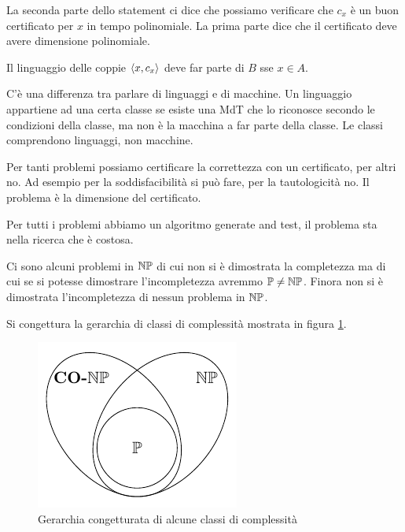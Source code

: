La seconda parte dello statement ci dice che possiamo verificare che $c_{x}$ è un buon certificato per
$x$ in tempo polinomiale. La prima parte dice che il certificato deve avere dimensione polinomiale.

Il linguaggio delle coppie $\langle x, c_{x} \rangle$ deve far parte di $B$ sse $x \in A$. 

C'è una differenza tra parlare di linguaggi e di macchine. Un linguaggio appartiene ad una certa
classe se esiste una MdT che lo riconosce secondo le condizioni della classe, ma non è la macchina
a far parte della classe. Le classi comprendono linguaggi, non macchine.

Per tanti problemi possiamo certificare la correttezza con un certificato, per altri no. Ad esempio
per la soddisfacibilità si può fare, per la tautologicità no. Il problema è la dimensione del
certificato.

Per tutti i problemi abbiamo un algoritmo generate and test, il problema sta nella ricerca che è
costosa.


Ci sono alcuni problemi in $\mathbb{NP}$ di cui non si è dimostrata la completezza ma di cui se si potesse
dimostrare l'incompletezza avremmo $\mathbb{P} \not= \mathbb{NP}$. Finora non si è dimostrata l'incompletezza di
nessun problema in $\mathbb{NP}$.


Si congettura la gerarchia di classi di complessità mostrata in figura \ref{ConjecturedHierarchy}.

\begin{figure}[h]
    \begin{center}
        \includegraphics{img/NPCONP.pdf}
    \end{center}
    \caption{Gerarchia congetturata di alcune classi di complessità}
    \label{ConjecturedHierarchy}
\end{figure}

